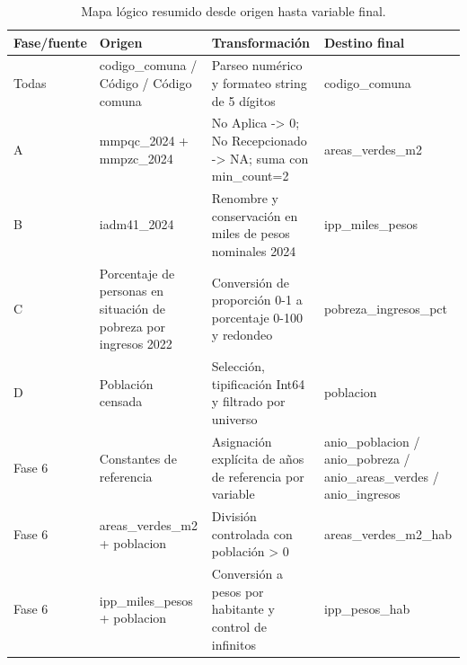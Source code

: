 \begin{table}[htbp]
\centering
\footnotesize
\caption{Mapa lógico resumido desde origen hasta variable final.}
\begin{tabular}{|p{1.2cm}|p{4.0cm}|p{5.5cm}|p{3.4cm}|}
\hline
Fase/fuente & Origen & Transformación & Destino final \\
\hline
Todas & codigo\_comuna / Código / Código comuna & Parseo numérico y formateo string de 5 dígitos & codigo\_comuna \\
A & mmpqc\_2024 + mmpzc\_2024 & No Aplica -> 0; No Recepcionado -> NA; suma con min\_count=2 & areas\_verdes\_m2 \\
B & iadm41\_2024 & Renombre y conservación en miles de pesos nominales 2024 & ipp\_miles\_pesos \\
C & Porcentaje de personas en situación de pobreza por ingresos 2022 & Conversión de proporción 0-1 a porcentaje 0-100 y redondeo & pobreza\_ingresos\_pct \\
D & Población censada & Selección, tipificación Int64 y filtrado por universo & poblacion \\
Fase 6 & Constantes de referencia & Asignación explícita de años de referencia por variable & anio\_poblacion / anio\_pobreza / anio\_areas\_verdes / anio\_ingresos \\
Fase 6 & areas\_verdes\_m2 + poblacion & División controlada con población > 0 & areas\_verdes\_m2\_hab \\
Fase 6 & ipp\_miles\_pesos + poblacion & Conversión a pesos por habitante y control de infinitos & ipp\_pesos\_hab \\
\hline
\end{tabular}
\end{table}
